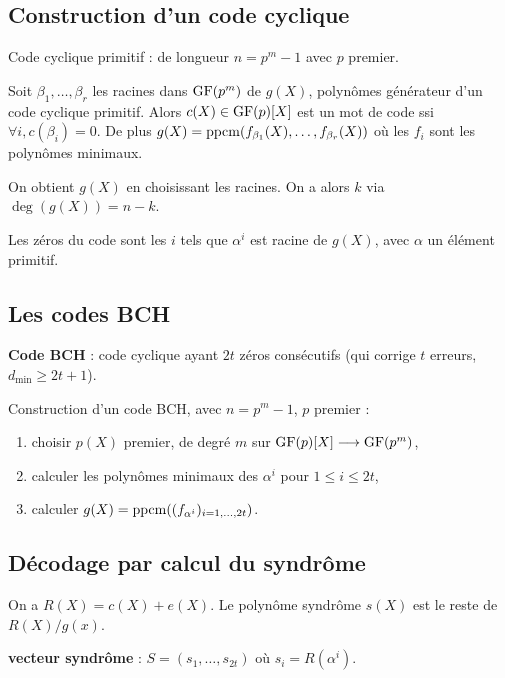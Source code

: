 \subsection{Construction d'un code cyclique}

	Code cyclique primitif : de longueur $n = p^m - 1$ avec $p$ premier.
	
	\begin{thm}
		Soit $\beta_1,\ldots,\beta_r$ les racines dans $\mathrm{GF}(p^m)$ de $g(X)$, polynômes générateur d'un code cyclique primitif.
		Alors $c(X) \in \mathrm{GF}(p)[X]$ est un mot de code ssi $\forall i, c(\beta_i) = 0$.
		De plus $g(X) = \operatorname{ppcm}(f_{\beta_1}(X),\ldots,f_{\beta_r}(X))$ où les $f_i$ sont les polynômes minimaux.
	\end{thm}

	On obtient $g(X)$ en choisissant les racines.
	On a alors $k$ via $\deg(g(X)) = n - k$.
	
	Les zéros du code sont les $i$ tels que $\alpha^i$ est racine de $g(X)$, avec $\alpha$ un élément primitif.


\subsection{Les codes BCH}

	\begin{defn}
		\textbf{Code BCH} : code cyclique ayant $2t$ zéros consécutifs (qui corrige $t$ erreurs, $d_\min \geq 2t + 1$).
	\end{defn}
	
	Construction d'un code BCH, avec $n = p^m - 1$, $p$ premier :
	\begin{enumerate}[1)]
		\item choisir $p(X)$ premier, de degré $m$ sur $\mathrm{GF}(p)[X] \longrightarrow \mathrm{GF}(p^m)$,
		\item calculer les polynômes minimaux des $\alpha^i$ pour $1 \leq i \leq 2t$,
		\item calculer $g(X) = \operatorname{ppcm}((f_{\alpha^i})_{i = 1,\ldots,2t})$.
	\end{enumerate}


\subsection{Décodage par calcul du syndrôme}

	On a $R(X) = c(X) + e(X)$.
	Le polynôme syndrôme $s(X)$ est le reste de $R(X)/g(x)$.
	
	\begin{defn}
		\textbf{vecteur syndrôme} : $S = (s_1,\ldots,s_{2t})$ où $s_i = R(\alpha^i)$.
	\end{defn}

